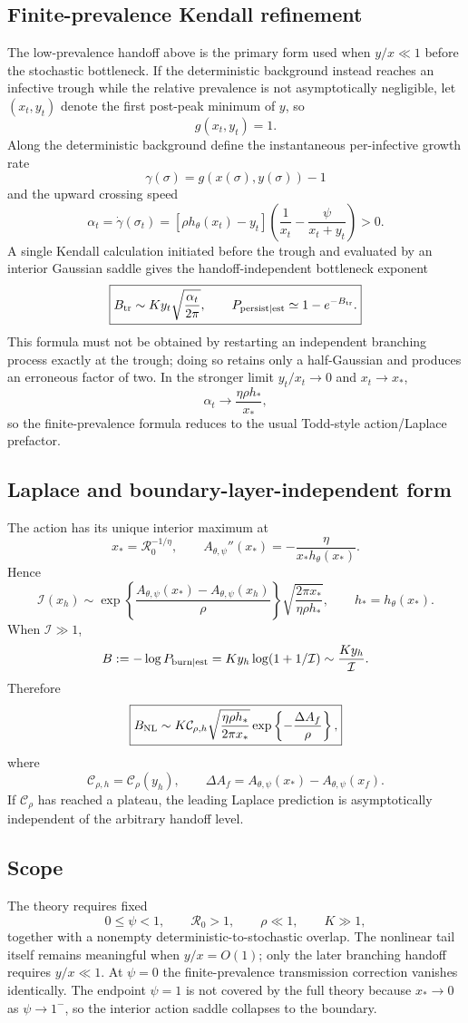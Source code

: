 \documentclass[11pt]{article}
\newcommand{\Rzero}{\mathcal R_0}
\newcommand{\hth}{h_\theta}
\newcommand{\Apsi}{A_{\theta,\psi}}
\newcommand{\xf}{x_f}
\newcommand{\xs}{x_*}
\newcommand{\CalC}{\mathcal C_\rho}
\begin{document}
\subsection{Finite-prevalence Kendall refinement}
The low-prevalence handoff above is the primary form used when $y/x\ll1$ before the stochastic bottleneck.  If the deterministic background instead reaches an infective trough while the relative prevalence is not asymptotically negligible, let $(x_t,y_t)$ denote the first post-peak minimum of $y$, so
\[
g(x_t,y_t)=1.
\]
Along the deterministic background define the instantaneous per-infective growth rate
\[
\gamma(\sigma)=g(x(\sigma),y(\sigma))-1
\]
and the upward crossing speed
\[
\boxed{
\alpha_t=\dot\gamma(\sigma_t)
=[\rho\hth(x_t)-y_t]
\left(\frac1{x_t}-\frac{\psi}{x_t+y_t}\right)>0.
}
\]
A single Kendall calculation initiated before the trough and evaluated by an interior Gaussian saddle gives the handoff-independent bottleneck exponent
\[
\boxed{
B_{\rm tr}\sim K y_t\sqrt{\frac{\alpha_t}{2\pi}},
\qquad
P_{\rm persist\mid est}\simeq1-e^{-B_{\rm tr}}.
}
\]
This formula must not be obtained by restarting an independent branching process exactly at the trough; doing so retains only a half-Gaussian and produces an erroneous factor of two.  In the stronger limit $y_t/x_t\to0$ and $x_t\to\xs$,
\[
\alpha_t\to\frac{\eta\rho h_*}{\xs},
\]
so the finite-prevalence formula reduces to the usual Todd-style action/Laplace prefactor.

\subsection{Laplace and boundary-layer-independent form}
The action has its unique interior maximum at
\[
\xs=\Rzero^{-1/\eta},
\qquad
\Apsi''(\xs)=-\frac{\eta}{\xs\hth(\xs)}.
\]
Hence
\[
\mathcal I(x_h)
\sim
\exp\left\{\frac{\Apsi(\xs)-\Apsi(x_h)}{\rho}\right\}
\sqrt{\frac{2\pi\xs}{\eta\rho h_*}},
\qquad
h_*=\hth(\xs).
\]
When $\mathcal I\gg1$,
\[
B:=-\log P_{\rm burn\mid est}
=Ky_h\log(1+1/\mathcal I)
\sim\frac{Ky_h}{\mathcal I}.
\]
Therefore
\[
\boxed{
B_{\rm NL}
\sim
K\mathcal C_{\rho,h}
\sqrt{\frac{\eta\rho h_*}{2\pi\xs}}
\exp\left\{-\frac{\Delta A_f}{\rho}\right\},
}
\]
where
\[
\mathcal C_{\rho,h}=\CalC(y_h),
\qquad
\Delta A_f=\Apsi(\xs)-\Apsi(\xf).
\]
If $\CalC$ has reached a plateau, the leading Laplace prediction is asymptotically independent of the arbitrary handoff level.

\subsection{Scope}
The theory requires fixed
\[
0\leq\psi<1,
\qquad
\Rzero>1,
\qquad
\rho\ll1,
\qquad
K\gg1,
\]
together with a nonempty deterministic-to-stochastic overlap. The nonlinear tail itself remains meaningful when $y/x=O(1)$; only the later branching handoff requires $y/x\ll1$. At $\psi=0$ the finite-prevalence transmission correction vanishes identically. The endpoint $\psi=1$ is not covered by the full theory because $\xs\to0$ as $\psi\to1^-$, so the interior action saddle collapses to the boundary.
\end{document}
